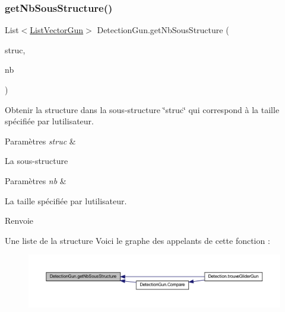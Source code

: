 \subsubsection{\texorpdfstring{get\+Nb\+Sous\+Structure()}{getNbSousStructure()}}
{\footnotesize\ttfamily List$<$\mbox{\hyperlink{class_list_vector_gun}{List\+Vector\+Gun}}$>$ Detection\+Gun.\+get\+Nb\+Sous\+Structure (\begin{DoxyParamCaption}\item[{List$<$ \mbox{\hyperlink{class_list_vector_gun}{List\+Vector\+Gun}} $>$}]{struc,  }\item[{int}]{nb }\end{DoxyParamCaption})\hspace{0.3cm}{\ttfamily [inline]}}



Obtenir la structure dans la sous-\/structure \char`\"{}struc\char`\"{} qui correspond à la taille spécifiée par l\textquotesingle{}utilisateur. 


\begin{DoxyParams}{Paramètres}
{\em struc} & \\
\hline
\end{DoxyParams}
La sous-\/structure 
\begin{DoxyParams}{Paramètres}
{\em nb} & \\
\hline
\end{DoxyParams}
La taille spécifiée par l\textquotesingle{}utilisateur. \begin{DoxyReturn}{Renvoie}

\end{DoxyReturn}
Une liste de la structure Voici le graphe des appelants de cette fonction \+:\nopagebreak
\begin{figure}[H]
\begin{center}
\leavevmode
\includegraphics[width=350pt]{class_detection_gun_a0a14866d2727aea5d457121bd646f3bb_icgraph}
\end{center}
\end{figure}
\mbox{\label{class_detection_gun_a488d963e0b78922904b6bd42182ca7b1}} 
